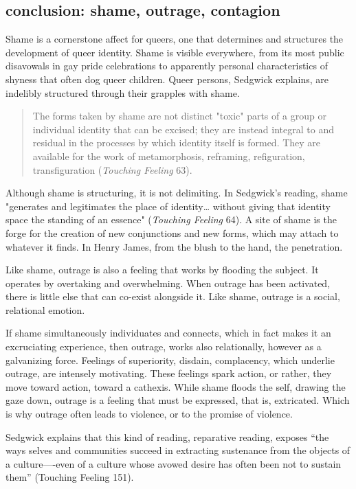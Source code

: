 \documentclass[11pt]{article}
\begin{document}
\subsection{conclusion: shame, outrage, contagion}
\label{sec:orgbbc2f54}
Shame is a cornerstone affect for queers, one that determines and
structures the development of queer identity. Shame is visible
everywhere, from its most public disavowals in gay pride celebrations
to apparently personal characteristics of shyness that often dog queer
children. Queer persons, Sedgwick explains, are indelibly structured
through their grapples with shame.
\begin{quote}
The forms taken by shame are not distinct "toxic" parts of a group or
individual identity that can be excised; they are instead integral to
and residual in the processes by which identity itself is formed. They
are available for the work of metamorphosis, reframing, refiguration,
transfiguration (\emph{Touching Feeling} 63). 
\end{quote}
Although shame is structuring, it is not delimiting. In Sedgwick's
reading, shame "generates and legitimates the place of identity\ldots{}
without giving that identity space the standing of an essence"
(\emph{Touching Feeling} 64). A site of shame is the forge for the creation
of new conjunctions and new forms, which may attach to whatever it
finds. In Henry James, from the blush to the hand, the penetration.

Like shame, outrage is also a feeling that works by flooding the
subject. It operates by overtaking and overwhelming. When outrage has
been activated, there is little else that can co-exist alongside it.
Like shame, outrage is a social, relational emotion.

If shame simultaneously individuates and connects, which in fact makes
it an excruciating experience, then outrage, works also relationally,
however as a galvanizing force. Feelings of superiority, disdain,
complacency, which underlie outrage, are intensely motivating. These
feelings spark action, or rather, they move toward action, toward a
cathexis. While shame floods the self, drawing the gaze down, outrage
is a feeling that must be expressed, that is, extricated. Which is why
outrage often leads to violence, or to the promise of violence.

Sedgwick explains that this kind of reading, reparative reading,
exposes “the ways selves and communities succeed in extracting
sustenance from the objects of a culture—-even of a culture whose
avowed desire has often been not to sustain them” (Touching Feeling
151).
\end{document}

